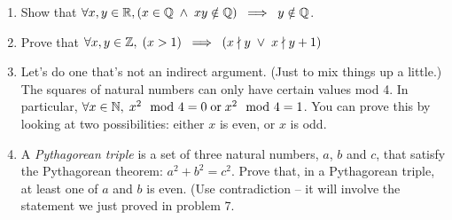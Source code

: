 \documentclass{amsart}
\begin{document}
\begin{enumerate}
\item Show that $\displaystyle \forall x, y \in {\mathbb R}, (x \in {\mathbb Q} \; \land \; xy \notin {\mathbb Q}) \; \implies \; y \notin {\mathbb Q}$.

\vfill

\item Prove that $\displaystyle \forall x, y \in {\mathbb Z}, \; (x >1 ) \; \implies \; ( x \nmid y \; \lor \; x \nmid y+1 )$

\vfill

\newpage

\item Let's do one that's not an indirect argument.  (Just to mix things up a little.) The squares of natural numbers can only have certain values mod 4.  In particular, $\forall x \in {\mathbb N}, \; x^2 \mod{4} = 0 \; \mbox{or} \; x^2 \mod{4} = 1$.  You can prove this by looking at two possibilities: either $x$ is even, or $x$ is odd.

\vfill

\item A \emph{Pythagorean triple} is a set of three
natural numbers, $a$, $b$ and $c$, that satisfy the Pythagorean theorem: $a^2 + b^2 = c^2$.   Prove that, in a
Pythagorean triple, at least one of $a$ and $b$ is even. (Use contradiction -- it will involve the statement we just proved in problem 7.

\vfill

\end{enumerate}
\end{document}
